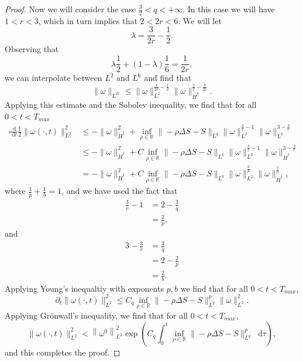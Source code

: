 \documentclass[11pt]{article}
\theoremstyle{plain}
\theoremstyle{remark}
\numberwithin{equation}{section}
\newcommand{\diff}{\mathop{}\!\mathrm{d}}
\begin{document}
\begin{proof}
Now we will consider the case $\frac{3}{2}<q<+\infty$.
In this case we will have $1<r<3$, which in turn implies that
$2<2r<6$. We will let
\begin{equation}
    \lambda=\frac{3}{2r}-\frac{1}{2}.
\end{equation}
Observing that
\begin{equation}
    \lambda\frac{1}{2}+(1-\lambda)\frac{1}{6}=\frac{1}{2r},
\end{equation}
we can interpolate between $L^2$ and $L^6$ and find that
\begin{equation}
    \|\omega\|_{L^{2r}}\leq 
    \|\omega\|_{L^2}^{\frac{3}{2r}-\frac{1}{2}}
    \|\omega\|_{\dot{H}^1}^{\frac{3}{2}-\frac{3}{2r}}.
\end{equation}
Applying this estimate and the Sobolev inequality,
we find that for all $0<t<T_{max}$
\begin{align}
    \frac{\diff}{\diff t}
    \frac{1}{2}\|\omega(\cdot,t)\|_{L^2}^2
    &\leq 
    -\|\omega\|_{\dot{H}^1}^2 +\inf_{\rho\in\mathbb{R}}
    \|-\rho\Delta S-S\|_{L^q}
    \|\omega\|_{L^2}^{\frac{3}{r}-1}
    \|\omega\|_{L^6}^{3-\frac{3}{r}} \\
    &\leq
    -\|\omega\|_{\dot{H}^1}^2 +C \inf_{\rho\in\mathbb{R}}
    \|-\rho\Delta S-S\|_{L^q}
    \|\omega\|_{L^2}^{\frac{3}{r}-1}
    \|\omega\|_{\dot{H}^1}^{3-\frac{3}{r}} \\
    &=
    -\|\omega\|_{\dot{H}^1}^2 +C \inf_{\rho\in\mathbb{R}}
    \|-\rho\Delta S-S\|_{L^q}
    \|\omega\|_{L^2}^{\frac{2}{p}}
    \|\omega\|_{\dot{H}^1}^{\frac{2}{b}},
\end{align}
where $\frac{1}{p}+\frac{1}{b}=1$,
and we have used the fact that
\begin{align}
    \frac{3}{r}-1
    &=
    2-\frac{3}{q} \\
    &=
    \frac{2}{p},
\end{align}
and
\begin{align}
    3-\frac{3}{r}
    &=
    \frac{3}{q} \\
    &=
    2-\frac{2}{p} \\
    &=
    \frac{2}{b}.
\end{align}
Applying Young's inequaltiy with exponents $p,b$ we find that
for all $0<t<T_{max}$,
\begin{equation}
    \partial_t \|\omega(\cdot,t)\|_{L^2}^2
    \leq C_q 
    \inf_{\rho\in\mathbb{R}} 
    \|-\rho\Delta S-S\|_{L^q}^p
    \|\omega\|_{L^2}^2.
\end{equation}
Applying Gr\"onwall's inequality, we find that for all
$0<t<T_{max}$,
\begin{equation}
    \|\omega(\cdot,t)\|_{L^2}^2
    <\left\|\omega^0\right\|_{L^2}^2
    \exp\left(C_q
    \int_0^{t}\inf_{\rho\in\mathbb{R}}
    \|-\rho\Delta S-S\|_{L^q}^p \diff\tau \right),
\end{equation}
and this completes the proof.
\end{proof}
\end{document}
